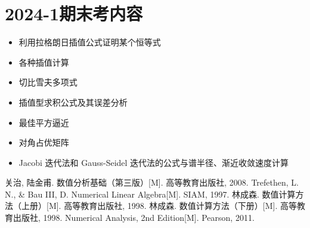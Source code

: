 \section{2024-1期末考内容}

\begin{itemize}
    \item 利用拉格朗日插值公式证明某个恒等式
    \item 各种插值计算
    \item 切比雪夫多项式
    \item 插值型求积公式及其误差分析
    \item 最佳平方逼近
    \item 对角占优矩阵
    \item Jacobi 迭代法和 Gauss-Seidel 迭代法的公式与谱半径、渐近收敛速度计算
\end{itemize}

\begin{thebibliography}{99}
     关治, 陆金甫. 数值分析基础（第三版）[M]. 高等教育出版社, 2008.
     Trefethen, L. N., \& Bau III, D. Numerical Linear Algebra[M]. SIAM, 1997.
     林成森. 数值计算方法（上册）[M]. 高等教育出版社, 1998.
     林成森. 数值计算方法（下册）[M]. 高等教育出版社, 1998.
     Numerical Analysis, 2nd Edition[M]. Pearson, 2011.
\end{thebibliography}
